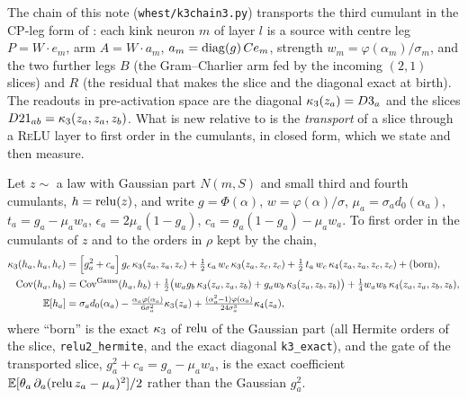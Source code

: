 \label{sec:transport}
The chain of this note (\texttt{whest/k3chain3.py}) transports the third cumulant in the CP-leg form of
\cite{Wu}: each kink neuron $m$ of layer $l$ is a source with centre leg $P=W\!\cdot e_m$, arm $A=W\!\cdot a_m$,
$a_m=\operatorname{diag}(g)\,Ce_m$, strength $w_m=\varphi(\alpha_m)/\sigma_m$, and the two further legs $B$ (the Gram--Charlier
arm fed by the incoming $(2,1)$ slices) and $R$ (the residual that makes the slice and the diagonal exact at
birth). The readouts in pre-activation space are the diagonal $\kappa_3(z_a)=D3_a$ and the slices
$D21_{ab}=\kappa_3(z_a,z_a,z_b)$. What is new relative to \cite{Wu} is the \emph{transport} of a slice through a
\textsc{ReLU} layer to first order in the cumulants, in closed form, which we state and then measure.

\begin{theorem}\label{thm:transport}
Let $z\sim$ a law with Gaussian part $N(m,S)$ and small third and fourth cumulants, $h=\operatorname{relu}(z)$, and write
$g=\Phi(\alpha)$, $w=\varphi(\alpha)/\sigma$, $\mu_a=\sigma_ad_0(\alpha_a)$, $t_a=g_a-\mu_aw_a$,
$\epsilon_a=2\mu_a(1-g_a)$, $c_a=g_a(1-g_a)-\mu_aw_a$. To first order in the cumulants of $z$ and to the orders in
$\rho$ kept by the chain,
\begin{align}
\kappa_3(h_a,h_a,h_c)&=\Big[g_a^2+c_a\Big]\,g_c\,\kappa_3(z_a,z_a,z_c)
+\tfrac12\,\epsilon_a\,w_c\,\kappa_3(z_a,z_c,z_c)+\tfrac12\,t_a\,w_c\,\kappa_4(z_a,z_a,z_c,z_c)+\text{(born)},\label{eq:slice-transport}\\
\operatorname{Cov}(h_a,h_b)&=\operatorname{Cov}^{\rm Gauss}(h_a,h_b)+\tfrac12\big(w_ag_b\,\kappa_3(z_a,z_a,z_b)+g_aw_b\,\kappa_3(z_a,z_b,z_b)\big)
+\tfrac14w_aw_b\,\kappa_4(z_a,z_a,z_b,z_b),\label{eq:cov-transport}\\
\mathbb E[h_a]&=\sigma_ad_0(\alpha_a)-\tfrac{\alpha_a\varphi(\alpha_a)}{6\sigma_a^2}\kappa_3(z_a)+\tfrac{(\alpha_a^2-1)\varphi(\alpha_a)}{24\sigma_a^3}\kappa_4(z_a),\label{eq:mean-readout}
\end{align}
where ``born'' is the exact $\kappa_3$ of $\operatorname{relu}$ of the Gaussian part (all Hermite orders of the slice,
\texttt{relu2\_hermite}, and the exact diagonal \texttt{k3\_exact}), and the gate of the transported slice,
$g_a^2+c_a=g_a-\mu_aw_a$, is the exact coefficient $\mathbb E[\theta_a\,\partial_a(\operatorname{relu} z_a-\mu_a)^2]/2$ rather than
the Gaussian $g_a^2$.
\end{theorem}
